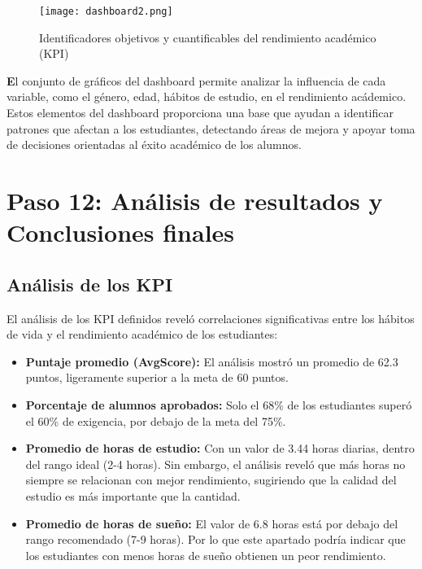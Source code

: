\documentclass[12pt,letterpaper]{report}
\begin{document}
\begin{figure}[!ht]
    \centering
    \texttt{[image: dashboard2.png]}
    \caption{Identificadores objetivos y cuantificables del rendimiento académico (KPI)}
    \label{fig:dashboard2}
\end{figure}

\textbf El conjunto de gráficos del dashboard permite analizar la influencia de cada variable, como el género, edad, hábitos de estudio, en el rendimiento acádemico. Estos elementos del dashboard proporciona una base que ayudan a identificar patrones que afectan a los estudiantes, detectando áreas de mejora y apoyar toma de decisiones orientadas al éxito académico de los alumnos.

\section{Paso 12: Análisis de resultados y Conclusiones finales}

\subsection{Análisis de los KPI}
El análisis de los KPI definidos reveló correlaciones significativas entre los hábitos de vida y el rendimiento académico de los estudiantes:

\begin{itemize}
    \item \textbf{Puntaje promedio (AvgScore):} El análisis mostró un promedio de 62.3 puntos, ligeramente superior a la meta de 60 puntos.
    
    \item \textbf{Porcentaje de alumnos aprobados:} Solo el 68\% de los estudiantes superó el 60\% de exigencia, por debajo de la meta del 75\%.
    
    \item \textbf{Promedio de horas de estudio:} Con un valor de 3.44 horas diarias, dentro del rango ideal (2-4 horas). Sin embargo, el análisis reveló que más horas no siempre se relacionan con mejor rendimiento, sugiriendo que la calidad del estudio es más importante que la cantidad.
    
    \item \textbf{Promedio de horas de sueño:} El valor de 6.8 horas está por debajo del rango recomendado (7-9 horas).
    Por lo que este apartado podría indicar que los estudiantes con menos horas de sueño obtienen un peor rendimiento.
\end{itemize}
\end{document}
